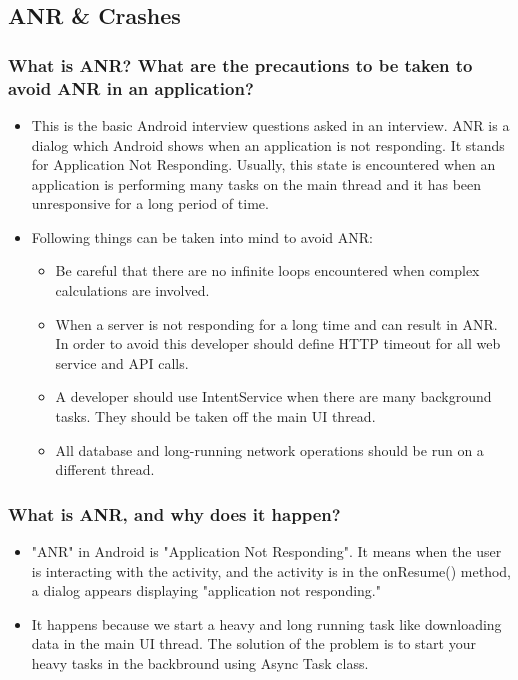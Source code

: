 \documentclass[9pt, b5paper]{article}
\begin{document}
\subsection{ANR \& Crashes}
\label{sec-1-6}
\subsubsection{What is ANR? What are the precautions to be taken to avoid ANR in an application?}
\label{sec-1-6-1}
\begin{itemize}
\item This is the basic Android interview questions asked in an interview. ANR is a dialog which Android shows when an application is not responding. It stands for Application Not Responding. Usually, this state is encountered when an application is performing many tasks on the main thread and it has been unresponsive for a long period of time.
\item Following things can be taken into mind to avoid ANR:
\begin{itemize}
\item Be careful that there are no infinite loops encountered when complex calculations are involved.
\item When a server is not responding for a long time and can result in ANR. In order to avoid this developer should define HTTP timeout for all web service and API calls.
\item A developer should use IntentService when there are many background tasks. They should be taken off the main UI thread.
\item All database and long-running network operations should be run on a different thread.
\end{itemize}
\end{itemize}
\subsubsection{What is ANR, and why does it happen?}
\label{sec-1-6-2}
\begin{itemize}
\item "ANR" in Android is "Application Not Responding". It means when the user is interacting with the activity, and the activity is in the onResume() method, a dialog appears displaying "application not responding."
\item It happens because we start a heavy and long running task like downloading data in the main UI thread. The solution of the problem is to start your heavy tasks in the backbround using Async Task class.
\end{itemize}
\end{document}
